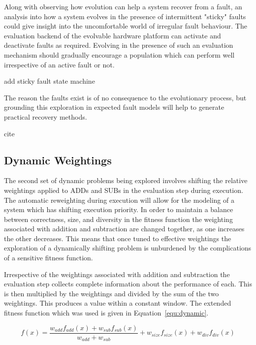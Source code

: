 Along with observing how evolution can help a system recover from a fault, an
analysis into how a system evolves in the presence of intermittent "sticky"
faults could give insight into the uncomfortable world of irregular fault behaviour.
The evaluation backend of the evolvable hardware platform can activate and
deactivate faults as required. Evolving in the presence of such an evaluation
mechanism should gradually encourage a population which can perform well
irrespective of an active fault or not.

\todo add sticky fault state machine

The reason the faults exist is of no consequence to the evolutionary process,
but grounding this exploration in expected fault models will help to generate
practical recovery methods.

\todo cite

\subsection{Dynamic Weightings}
The second set of dynamic problems being explored involves shifting the relative
weightings applied to ADDs and SUBs in the evaluation step during execution. The
automatic reweighting during execution will allow for the modeling of a system
which has shifting execution priority. In order to maintain a balance between
correctness, size, and diversity in the fitness function the weighting associated
with addition and subtraction are changed together, as one increases the other
decreases. This means that once tuned to effective weightings the exploration of
a dynamically shifting problem is unburdened by the complications of a sensitive
fitness function.

Irrespective of the weightings associated with addition and subtraction the
evaluation step collects complete information about the performance of each.
This is then multiplied by the weightings and divided by the sum of the two
weightings. This produces a value within a constant window. The extended fitness
function which was used is given in Equation~\ref{equ:dynamic}.

\begin{equation}
	\label{equ:dynamic}
	f(x) = \frac{w_{add} f_{add}(x) + w_{sub} f_{sub}(x)}{w_{add} + w_{sub}} + w_{size} f_{size}(x) +
	w_{div} f_{div}(x)
\end{equation}
